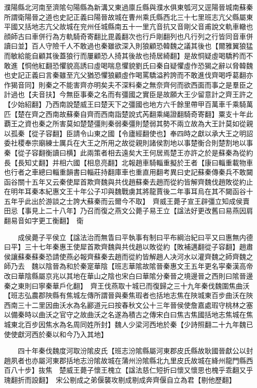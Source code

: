 濮陽縣北河南至濟隂句陽縣為新溝又東過廪丘縣與濮水俱東瓠河又逕陽晉城南蘇秦所謂衛陽晉之道也史記正義曰陽晉故城在曹州乘氏縣西北三十七里班志亢父縣屬東平國又括地志亢父故城在兖州任城縣南五十一里亢音抗又音剛父音甫說文軌車轍也顔師古曰車併行為方軌騎奇寄翻比毘義翻次也行戶剛翻列也凡行列之行皆同音車併讀曰並】百人守險千人不敢過也秦雖欲深入則狼顧恐韓魏之議其後也【爾雅翼狼猛而敏給能自顧其後蓋狼行而屢顧恐人掎其後故也掎居綺翻】是故恫疑虛喝驕矜而不敢進【恫他紅翻恐懼貌高誘曰虛喝喘息懼貌劉氏曰秦自疑懼虛作恐猲之辭以脅韓魏也史記正義曰言秦雖至亢父猶恐懼狼顧虛作喝罵驕溢矜誇而不敢進伐齊喝呼葛翻亦作猲音同】則秦之不能害齊亦明矣夫不深料秦之無奈齊何而欲西面而事之是羣臣之計過也【夫音扶】今無臣事秦之名而有彊國之實臣是故願大王少留意計之齊王許之【少始紹翻】乃西南說楚威王曰楚天下之彊國也地方六千餘里帶甲百萬車千乘騎萬匹【楚在齊之西南故蘇秦自齊而西南詣楚說式芮翻乘䋲證翻騎奇寄翻】粟支十年此覇王之資也秦之所害莫如楚楚彊則秦弱秦彊則楚弱其勢不兩立故為大王計莫如從親以孤秦【從子容翻】臣請令山東之國【令廬經翻使也】奉四時之獻以承大王之明詔委社稷奉宗廟練士厲兵在大王之所用之故從親則諸侯割地以事楚衡合則楚割地以事秦【從子容翻衡讀曰横】此兩策者相去遠矣大王何居焉楚王亦許之於是蘇秦為從約長【長知丈翻】并相六國【相息亮翻】北報趙車騎輜重擬於王者【康曰輜重載物車也行者之車總曰輜重韻書曰輜莊持翻庫車也重直用翻考異曰史記蘇秦傳秦兵不敢闚函谷關十五年又云秦使犀首欺齊魏與共伐趙蘇秦去趙而從約皆解齊魏伐趙敗從約止在明年耳秦本紀惠文王十年公子卭與魏戰虜其將龍賈後二年事耳烏在其不闚函谷十五年乎此出於游談之士誇大蘇秦而云爾今不取】　齊威王薨子宣王辟彊立知成侯賣田忌【事見上二十八年】乃召而復之燕文公薨子易王立【諡法好更改舊曰易燕因肩翻易音如字更工衡翻】　衛

　　成侯薨子平侯立【諡法治而無眚曰平執事有制曰平布綱治紀曰平又曰惠無内德曰平】三十七年秦惠王使犀首欺齊魏與共伐趙以敗從約【敗補邁翻從子容翻】趙肅侯讓蘇秦蘇秦恐請使燕必報齊蘇秦去趙而從約皆解趙人决河水以灌齊魏之師齊魏之師乃去　魏以陰晉為和於秦寔華陰【班志華隂故隂晉秦惠文王五年更名寜秦漢高帝改曰華陰縣屬京兆以其地在華山之陰也宋白曰華隂分秦晉之境邊晉之西則曰隂晉邊秦之東則曰寧秦華戶化翻】　齊王伐燕取十城已而復歸之三十九年秦伐魏圍焦曲沃【班志弘農郡陜縣有焦城左傳所謂晉與秦焦瑕者也括地志焦在陜城東百步曲沃在陜西南三十二里因曲沃水為名酈道元曰按春秋文公十三年晉侯使詹嘉處瑕守桃林之塞以備秦時以曲沃之官守之故曲沃之名遂為積古之傳宋白曰焦古焦國括地志焦城在焦城東北百步因焦水為名周同姓所封】魏人少梁河西地於秦【少詩照翻二十九年魏已使使獻河西於秦以和今乃入其地】

　　四十年秦伐魏度河取汾隂皮氏【班志汾隂縣屬河東郡皮氏縣故耿國晉獻公以封趙夙者也亦屬河東郡括地志汾隂故城在蒲州汾隂縣北九里皮氏故城在絳州龍門縣西百八十步】抜焦　楚威王薨子懷王槐立【諡法慈仁短折曰懷又懷思也槐乎乖翻又乎瑰翻折而設翻】　宋公剔成之弟偃襲攻剔成剔成奔齊偃自立為君【剔他歷翻】

